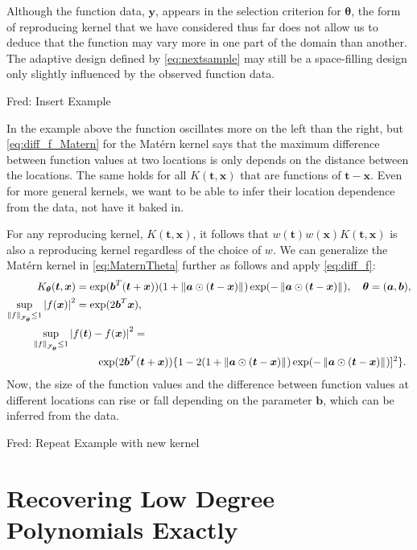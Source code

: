 \documentclass[]{mcom-l}
\theoremstyle{remark}
\newcommand{\ba}{{\boldsymbol{a}}}
\newcommand{\bb}{{\boldsymbol{b}}}
\newcommand{\bx}{{\boldsymbol{x}}}
\newcommand{\by}{{\boldsymbol{y}}}
\newcommand{\bt}{{\boldsymbol{t}}}
\newcommand{\btheta}{{\boldsymbol{\theta}}}
\newcommand{\calf}{{\mathcal{F}}}
\def\abs#1{\ensuremath{\left \lvert #1 \right \rvert}}
\newcommand{\norm}[2][{}]{\ensuremath{\left \lVert #2 \right \rVert}_{#1}}
\newcommand{\FredNote}[1]{{\color{blue}Fred: #1}}
\begin{document}
Although the function data, $\by$, appears in the selection criterion for $\btheta$, the form of reproducing kernel that we have considered thus far does not allow us to deduce that the function may vary more in one part of the domain than another.  The adaptive design defined by \eqref{eq:nextsample} may still be a space-filling design only slightly influenced by the observed function data.

\FredNote{Insert Example}

In the example above the function oscillates more on the left than the right, but \eqref{eq:diff_f_Matern} for the Mat\'ern kernel says that the maximum difference between function values at two locations is only depends on the distance between the locations.  The same holds for all $K(\bt ,\bx)$ that are  functions of $\bt - \bx$.  Even for more general kernels, we want to be able to infer their location dependence from the data, not have it baked in.

For any reproducing kernel, $K(\bt ,\bx)$, it follows that $w(\bt)w(\bx)K(\bt ,\bx)$ is also a reproducing kernel regardless of the choice of $w$.  We can generalize the Mat\'ern kernel in \eqref{eq:MaternTheta} further as follows and apply \eqref{eq:diff_f}:
\begin{align} \label{eq:MaternAB}
K_\btheta(\bt,\bx) &= \exp(\bb^T(\bt + \bx))(1 +  \norm{\ba \odot (\bt-\bx)}) \exp(-\norm{\ba \odot (\bt-\bx)}),  \quad \btheta=(\ba, \bb), \\
\nonumber
\sup_{\norm[\calf_{\btheta}]{f} \le 1} \abs{f(\bx)}^2 &= \exp(2\bb^T\bx), \\
\nonumber
\MoveEqLeft[4]{\sup_{\norm[\calf_{\btheta}]{f} \le 1} \abs{f(\bt) - f(\bx)}^2} = \\
\nonumber 
& \qquad \exp(2\bb^T(\bt + \bx))\{ 1 - 2 (1 +  \norm{\ba \odot (\bt-\bx)}) \exp(-\norm{\ba \odot (\bt-\bx)})]^2\}.
\end{align}
Now, the size of the function values and the difference between function values at different locations can rise or fall depending on the parameter $\bb$, which can be inferred from the data.


\FredNote{Repeat Example with new kernel}

\section{Recovering Low Degree Polynomials Exactly} \label{sec:poly}
\end{document}
